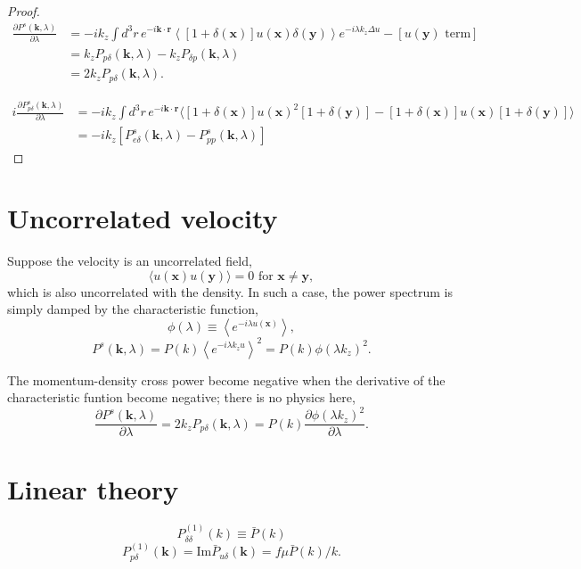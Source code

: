 \documentclass[a4paper,11pt, fleqn]{article}
\begin{document}
\begin{proof}
\begin{equation}\begin{split}
  \frac{\partial P^s(\bm{k}, \lambda)}{\partial \lambda}
  &= -ik_z \int \! d^3r \, e^{-i\bm{k}\cdot\bm{r}} \left\langle
       [1 + \delta(\bm{x})] u(\bm{x}) \delta(\bm{y}) \right\rangle
       e^{-i\lambda k_z \Delta u}
       - [u(\bm{y}) \mbox{ term}]\\
  &= k_z P_{p\delta}(\bm{k}, \lambda) - k_z P_{\delta p}(\bm{k}, \lambda)\\
  &= 2k_z P_{p\delta}(\bm{k}, \lambda).
\end{split}\end{equation}

\begin{equation}\begin{split}
  i \frac{\partial P_{p\delta}^s(\bm{k}, \lambda)}{\partial \lambda}
  &= -ik_z \int\! d^3 r \, e^{-i\bm{k}\cdot\bm{r}} \Big\langle
  [1 + \delta(\bm{x})]u(\bm{x})^2 [ 1 + \delta(\bm{y}) ]
  - [1 + \delta(\bm{x})]u(\bm{x}) [ 1 + \delta(\bm{y}) ]
  \Big\rangle\\
  &= -ik_z \left[ P^s_{e\delta}(\bm{k}, \lambda) - P^s_{pp}(\bm{k}, \lambda)
    \right]
\end{split}\end{equation}
\end{proof}

\clearpage
%
%
\section{Uncorrelated velocity}

Suppose the velocity is an uncorrelated field,
\begin{equation}
  \langle u(\bm{x}) u(\bm{y}) \rangle = 0 \mbox{ for $\bm{x} \neq \bm{y}$},
\end{equation}
which is also uncorrelated with the density.
In such a case, the power spectrum is simply damped by the
characteristic function,
%
\begin{equation}
  \phi(\lambda) \equiv \left\langle e^{-i\lambda u(\bm{x})}\right\rangle,
\end{equation}
%
\begin{equation}
  P^s(\bm{k}, \lambda) = P(k) \left\langle e^{-i\lambda k_z u} \right\rangle^2
  = P(k) \phi(\lambda k_z)^2.
\end{equation}

The momentum-density cross power become negative when the derivative of the characteristic funtion become negative; there is no physics here,
\begin{equation}
  \frac{\partial P^s(\bm{k}, \lambda)}{\partial \lambda}
  = 2k_z P_{p\delta}(\bm{k}, \lambda)
  = P(k) \frac{\partial \phi(\lambda k_z)^2}{\partial \lambda}.
\end{equation}



\clearpage
\section{Linear theory}

\begin{equation}
  P_{\delta\delta}^{(1)}(k) \equiv \bar{P}(k)
\end{equation}
\begin{equation}
  P_{p\delta}^{(1)}(\bm{k}) = \mathrm{Im} \bar{P}_{u\delta}(\bm{k})
  = f\mu \bar{P}(k)/k.
\end{equation}
\end{document}
